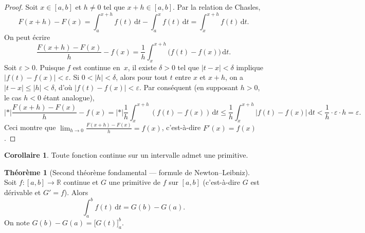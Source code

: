 \documentclass[12pt,a4paper,openany]{book}
\theoremstyle{definition}
\newtheorem{theoreme}{Théorème}[chapter]
\newtheorem{corollaire}{Corollaire}[chapter]
\newcommand{\R}{\mathbb{R}}
\newcommand{\eps}{\varepsilon}
\newcommand{\abs}[1]{\left\lvert #1 \right\rvert}
\newcommand{\dd}{\mathrm{d}}
\begin{document}
\begin{proof}
  Soit $x \in [a,b]$ et $h \neq 0$ tel que $x + h \in [a,b]$. Par la relation de Chasles,
  \[
    F(x+h) - F(x) = \int_a^{x+h} f(t)\,\dd t - \int_a^x f(t)\,\dd t = \int_x^{x+h} f(t)\,\dd t.
  \]
  On peut écrire
  \[
    \frac{F(x+h) - F(x)}{h} - f(x) = \frac{1}{h}\int_x^{x+h} \bigl(f(t) - f(x)\bigr)\,\dd t.
  \]
  Soit $\eps > 0$. Puisque $f$ est continue en~$x$, il existe $\delta > 0$ tel que $\abs{t - x} < \delta$ implique $\abs{f(t) - f(x)} < \eps$. Si $0 < \abs{h} < \delta$, alors pour tout $t$ entre $x$ et $x+h$, on a $\abs{t - x} \leqslant \abs{h} < \delta$, d'où $\abs{f(t) - f(x)} < \eps$. Par conséquent (en supposant $h > 0$, le cas $h < 0$ étant analogue),
  \[
    \abs*{\frac{F(x+h)-F(x)}{h} - f(x)}
    = \abs*{\frac{1}{h}\int_x^{x+h}(f(t)-f(x))\,\dd t}
    \leqslant \frac{1}{h}\int_x^{x+h}\abs{f(t)-f(x)}\,\dd t
    < \frac{1}{h} \cdot \eps \cdot h = \eps.
  \]
  Ceci montre que $\displaystyle\lim_{h \to 0}\frac{F(x+h)-F(x)}{h} = f(x)$, c'est-à-dire $F'(x) = f(x)$.
\end{proof}

\begin{center}
\end{center}

\begin{corollaire}\label{cor:primitive}
  Toute fonction continue sur un intervalle admet une primitive.
\end{corollaire}

\begin{theoreme}[Second théorème fondamental --- formule de Newton--Leibniz]\label{thm:newton-leibniz}
  Soit $f \colon [a,b] \to \R$ continue et $G$ une primitive de $f$ sur $[a,b]$ (c'est-à-dire $G$ est dérivable et $G' = f$). Alors
  \[
    \int_a^b f(t)\,\dd t = G(b) - G(a).
  \]
  On note $G(b) - G(a) = \bigl[G(t)\bigr]_a^b$.
\end{theoreme}
\end{document}
